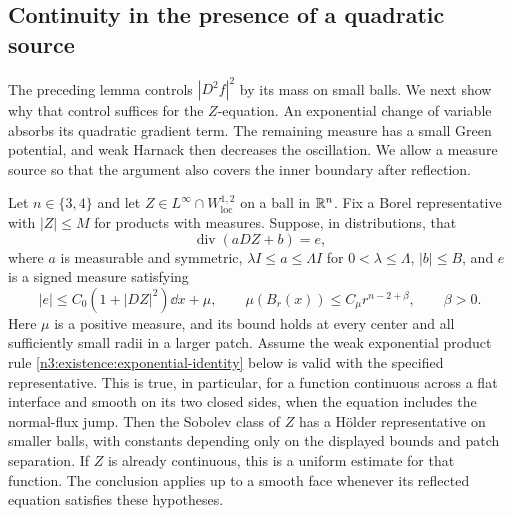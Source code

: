 \subsection{Continuity in the presence of a quadratic source}

The preceding lemma controls $|D^2f|^2$ by its mass on small balls.
We next show why that control suffices for the $Z$-equation.
An exponential change of variable absorbs its quadratic gradient
term. The remaining measure has a small Green potential, and weak
Harnack then decreases the oscillation. We allow a measure source
so that the argument also covers the inner boundary after reflection.

\begin{lemma}
\label{n3:existence:natural-growth}\label{b:lem:natural-growth}
Let $n\in\{3,4\}$ and let $Z\in L^\infty\cap W^{1,2}_{\mathrm{loc}}$
on a ball in $\mathbb R^n$. Fix a Borel representative with $|Z|\le M$ for
products with measures. Suppose, in distributions, that
\begin{equation}\label{n3:existence:natural-equation}
 \operatorname{div}(aDZ+b)=e,
\end{equation}
where $a$ is measurable and symmetric, $\lambda I\le a\le\Lambda I$
for $0<\lambda\le\Lambda$, $|b|\le B$, and $e$ is a signed measure
satisfying
\begin{equation}\label{n3:existence:natural-source}
 |e|\le C_0(1+|DZ|^2)\dd x+\mu,\qquad
 \mu(B_r(x))\le C_\mu r^{n-2+\beta},\qquad \beta>0.
\end{equation}
Here $\mu$ is a positive measure, and its bound holds at every center
and all sufficiently small radii in a larger patch. Assume the weak
exponential product rule \eqref{n3:existence:exponential-identity} below
is valid with the specified representative. This is true, in particular,
for a function continuous across a flat interface and smooth on its
two closed sides, when the equation includes the normal-flux jump.
Then the Sobolev class of $Z$ has a H\"older representative on smaller
balls, with constants depending only on the displayed bounds and patch
separation. If $Z$ is already continuous, this is a uniform estimate
for that function. The conclusion applies up to a smooth face whenever
its reflected equation satisfies these hypotheses.
\end{lemma}

